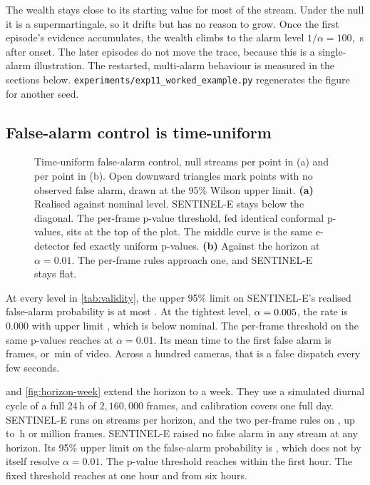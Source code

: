 The wealth stays close to its starting value for most of the stream. Under the
null it is a supermartingale, so it drifts but has no reason to grow. Once the
first episode's evidence accumulates, the wealth climbs to the alarm level
$1/\alpha=100$, \WorkedDelaySec{}\,s after onset. The later episodes do not
move the trace, because this is a single-alarm illustration. The restarted,
multi-alarm behaviour is measured in the sections below.
\texttt{experiments/exp11\_worked\_example.py} regenerates the figure for
another seed.

\subsection{False-alarm control is time-uniform}
\label{sec:validity}

\begin{figure}[t]
  \centering
  \caption{Time-uniform false-alarm control, \ExpOneReps{} null streams per point
  in (a) and \ExpOneHorizonReps{} per point in (b). Open downward triangles mark
  points with no observed false alarm, drawn at the 95\% Wilson upper limit.
  \textbf{(a)} Realised against nominal level. SENTINEL-E stays below the
  diagonal. The per-frame p-value threshold, fed identical conformal p-values,
  sits at the top of the plot. The middle curve is the same e-detector fed exactly
  uniform p-values. \textbf{(b)} Against the horizon at $\alpha=0.01$. The
  per-frame rules approach one, and SENTINEL-E stays flat.}
  \label{fig:validity}
\end{figure}


At every level in \cref{tab:validity}, the upper 95\% limit on SENTINEL-E's
realised false-alarm probability is at most \ValidityWorstCiHi{}. At the
tightest level, $\alpha=0.005$, the rate is $0.000$ with upper
limit \ValidityTightestCiHi{}, which is below nominal. The per-frame threshold
on the same p-values reaches \ValidityPfaPvalue{} at $\alpha=0.01$. Its mean time
to the first false alarm is \ValidityPvalueArl{} frames, or
\ValidityPvalueArlMin{}\,min of video. Across a hundred cameras, that is a false
dispatch every few seconds.

 and \cref{fig:horizon-week} extend the horizon to a week.
They use a simulated diurnal cycle of a full 24\,h of $2{,}160{,}000$ frames, and calibration
covers one full day. SENTINEL-E runs on \HorizonWeekReps{} streams per horizon,
and the two per-frame rules on \HorizonWeekBaselineReps{}, up to
\HorizonWeekMaxHours{}\,h or \HorizonWeekMaxMFrames{} million frames. SENTINEL-E
raised no false alarm in any stream at any horizon. Its 95\% upper limit on the
false-alarm probability is \HorizonWeekSentinelCiHi{}, which does not by itself
resolve $\alpha=0.01$. The p-value threshold
reaches \HorizonWeekPvalueOneHour{} within the first hour. The fixed threshold
reaches \HorizonWeekFixedOneHour{} at one hour and \HorizonWeekFixedSixHour{}
from six hours.

